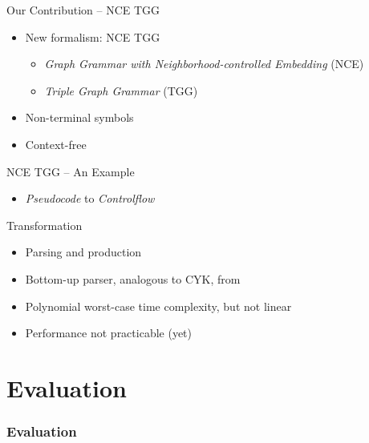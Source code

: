 \documentclass[usenames,dvipsnames]{beamer}
\begin{document}
	\begin{frame}{Our Contribution -- NCE TGG}
		\begin{itemize}
			\item New formalism: NCE TGG
			\begin{itemize}
				\item \emph{Graph Grammar with Neighborhood-controlled Embedding} (NCE) \cite{janssens1982graph}
				\item \emph{Triple Graph Grammar} (TGG) \cite{schurr1994specification}
			\end{itemize}
			\item Non-terminal symbols
			\item Context-free
		\end{itemize}
	\end{frame}
	
	\begin{frame}{NCE TGG -- An Example}
		\begin{itemize}
			\item \emph{Pseudocode} to \emph{Controlflow}
		\end{itemize}
		
		
	\end{frame}
	
	\begin{frame}{Transformation}
		\begin{itemize}
			\item Parsing and production
			\item Bottom-up parser, analogous to CYK, from \cite{rozenberg1986boundary}
			\item Polynomial worst-case time complexity, but not linear
			\item Performance not practicable (yet)
		\end{itemize}
	\end{frame}
	
	\section{Evaluation}
	\begin{frame}
		\frametitle{Evaluation}
	\end{frame}
	
\end{document}
